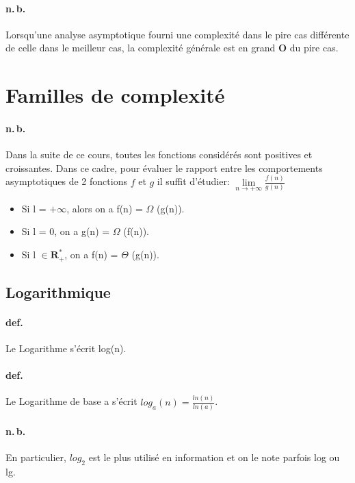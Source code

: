 \documentclass{report}
\begin{document}
    \paragraph{n.\,b.} Lorsqu'une analyse asymptotique fourni une complexité dans le pire cas différente de celle dans le meilleur cas, la complexité générale est en grand \textbf{O} du pire cas.

   \section{Familles de complexité}

    \paragraph{n.\,b.} Dans la suite de ce cours, toutes les fonctions considérés sont positives et croissantes. Dans ce cadre, pour évaluer le rapport entre les comportements asymptotiques de 2 fonctions $f$ et $g$ il suffit d'étudier: $\lim\limits_{n \rightarrow +\infty} \frac{f(n)}{g(n)}$

    \begin{itemize}
      \item Si l = $+\infty$, alors on a f(n) = $\Omega$ (g(n)).
      \item Si l = 0, on a g(n) = $\Omega$ (f(n)).
      \item Si l $\in \mathbf{R}^{*}_{+}$, on a f(n) = $\Theta$ (g(n)).
    \end{itemize}

    \subsection{Logarithmique}

      \paragraph{def.} Le Logarithme s'écrit log(n).

      \paragraph{def.} Le Logarithme de base a s'écrit $log_{a}(n) = \frac{ln(n)}{ln(a)}$.

      \paragraph{n.\,b.} En particulier, $log_{2}$ est le plus utilisé en information et on le note parfois log ou lg.
\end{document}
